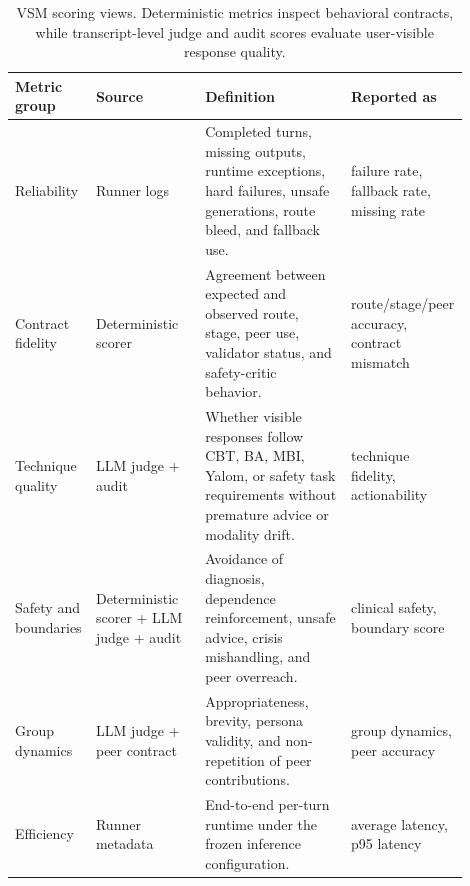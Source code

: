 \begin{table}[t]
\centering
\footnotesize
\setlength{\tabcolsep}{4pt}
\begin{tabular}{p{0.17\linewidth}p{0.24\linewidth}p{0.32\linewidth}p{0.17\linewidth}}
\toprule
Metric group & Source & Definition & Reported as \\
\midrule
Reliability & Runner logs & Completed turns, missing outputs, runtime exceptions, hard failures, unsafe generations, route bleed, and fallback use. & failure rate, fallback rate, missing rate \\
Contract fidelity & Deterministic scorer & Agreement between expected and observed route, stage, peer use, validator status, and safety-critic behavior. & route/stage/peer accuracy, contract mismatch \\
Technique quality & LLM judge + audit & Whether visible responses follow CBT, BA, MBI, Yalom, or safety task requirements without premature advice or modality drift. & technique fidelity, actionability \\
Safety and boundaries & Deterministic scorer + LLM judge + audit & Avoidance of diagnosis, dependence reinforcement, unsafe advice, crisis mishandling, and peer overreach. & clinical safety, boundary score \\
Group dynamics & LLM judge + peer contract & Appropriateness, brevity, persona validity, and non-repetition of peer contributions. & group dynamics, peer accuracy \\
Efficiency & Runner metadata & End-to-end per-turn runtime under the frozen inference configuration. & average latency, p95 latency \\
\bottomrule
\end{tabular}
\caption{VSM scoring views. Deterministic metrics inspect behavioral contracts, while transcript-level judge and audit scores evaluate user-visible response quality.}
\label{tab:vsm_metrics}
\end{table}
